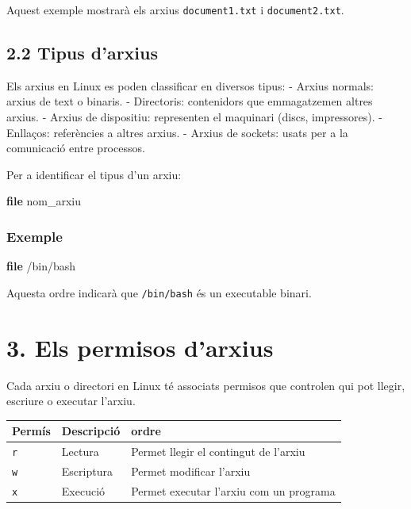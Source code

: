 \documentclass[
  12 pt,
  a4paper,
]{article}
\newenvironment{Shaded}{\begin{snugshade}}{\end{snugshade}}
\newcommand{\FunctionTok}[1]{\textcolor[rgb]{0.13,0.29,0.53}{\textbf{#1}}}
\newcommand{\NormalTok}[1]{#1}
\begin{document}
Aquest exemple mostrarà els arxius \texttt{document1.txt} i
\texttt{document2.txt}.

\subsection{2.2 Tipus d'arxius}\label{tipus-darxius}

Els arxius en Linux es poden classificar en diversos tipus: - Arxius
normals: arxius de text o binaris. - Directoris: contenidors que
emmagatzemen altres arxius. - Arxius de dispositiu: representen el
maquinari (discs, impressores). - Enllaços: referències a altres arxius.
- Arxius de sockets: usats per a la comunicació entre processos.

Per a identificar el tipus d'un arxiu:

\begin{Shaded}
\begin{Highlighting}[]
\FunctionTok{file}\NormalTok{ nom\_arxiu}
\end{Highlighting}
\end{Shaded}

\subsubsection{Exemple}\label{exemple}

\begin{Shaded}
\begin{Highlighting}[]
\FunctionTok{file}\NormalTok{ /bin/bash}
\end{Highlighting}
\end{Shaded}

Aquesta ordre indicarà que \texttt{/bin/bash} és un executable binari.

\section{3. Els permisos d'arxius}\label{els-permisos-darxius}

Cada arxiu o directori en Linux té associats permisos que controlen qui
pot llegir, escriure o executar l'arxiu.

\begin{longtable}[]{@{}lll@{}}
\toprule\noalign{}
Permís & Descripció & ordre \\
\midrule\noalign{}
\endhead
\bottomrule\noalign{}
\endlastfoot
\texttt{r} & Lectura & Permet llegir el contingut de l'arxiu \\
\texttt{w} & Escriptura & Permet modificar l'arxiu \\
\texttt{x} & Execució & Permet executar l'arxiu com un programa \\
\end{longtable}
\end{document}
